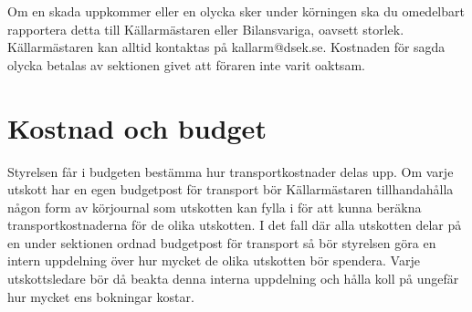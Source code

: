 \documentclass{dsekprotokoll}
\begin{document}
Om en skada uppkommer eller en olycka sker under körningen ska du omedelbart rapportera detta till Källarmästaren eller Bilansvariga, oavsett storlek. Källarmästaren kan alltid kontaktas på kallarm@dsek.se. Kostnaden för sagda olycka betalas av sektionen givet att föraren inte varit oaktsam.
\section{Kostnad och budget}
Styrelsen får i budgeten bestämma hur transportkostnader delas upp. Om varje utskott har en egen budgetpost för transport bör Källarmästaren tillhandahålla någon form av körjournal som utskotten kan fylla i för att kunna beräkna transportkostnaderna för de olika utskotten. I det fall där alla utskotten delar på en under sektionen ordnad budgetpost för transport så bör styrelsen göra en intern uppdelning över hur mycket de olika utskotten bör spendera. Varje utskottsledare bör då beakta denna interna uppdelning och hålla koll på ungefär hur mycket ens bokningar kostar.\newline
\end{document}
